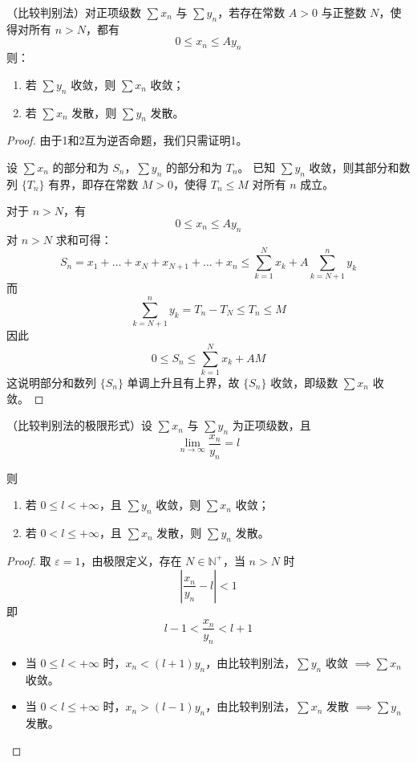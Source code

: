 \begin{proposition}\label{比较判别法}
	（比较判别法）对正项级数 $\sum x_n$ 与 $\sum y_n$，若存在常数 $A>0$ 与正整数 $N$，使得对所有 $n > N$，都有
	\[
	0 \le x_n \le A y_n
	\]
	则：
	\begin{enumerate}
		\item 若 $\sum y_n$ 收敛，则 $\sum x_n$ 收敛；
		\item 若 $\sum x_n$ 发散，则 $\sum y_n$ 发散。
	\end{enumerate}

	
\end{proposition}
\begin{proof}
	由于1和2互为逆否命题，我们只需证明1。
	
	设 $\sum x_n$ 的部分和为 $S_n$，$\sum y_n$ 的部分和为 $T_n$。
	已知 $\sum y_n$ 收敛，则其部分和数列 $\{T_n\}$ 有界，即存在常数 $M>0$，使得 $T_n \le M$ 对所有 $n$ 成立。
	
	对于 $n > N$，有
	\[
	0 \le x_n \le A y_n
	\]
	对 $n > N$ 求和可得：
	\[
	S_n = x_1 + \dots + x_N + x_{N+1} + \dots + x_n
	\le \sum_{k=1}^{N} x_k + A \sum_{k=N+1}^{n} y_k
	\]
	而
	\[
	\sum_{k=N+1}^{n} y_k = T_n - T_N \le T_n \le M
	\]
	因此
	\[
	0 \le S_n \le \sum_{k=1}^{N} x_k + A M
	\]
	这说明部分和数列 $\{S_n\}$ 单调上升且有上界，故 $\{S_n\}$ 收敛，即级数 $\sum x_n$ 收敛。
\end{proof}
\begin{corollary}
	（比较判别法的极限形式）设 $\sum x_n$ 与 $\sum y_n$ 为正项级数，且
	\[
	\lim_{n\to\infty} \frac{x_n}{y_n} = l
	\]
	
	则
	\begin{enumerate}
		\item 若 $0 \le l < +\infty$，且 $\sum y_n$ 收敛，则 $\sum x_n$ 收敛；
		\item 若 $0 < l \le +\infty$，且 $\sum x_n$ 发散，则 $\sum y_n$ 发散。
	\end{enumerate}
	
\end{corollary}
\begin{proof}
	取 $\varepsilon = 1$，由极限定义，存在 $N \in \mathbb{N}^+$，当 $n > N$ 时
	\[
	\left| \frac{x_n}{y_n} - l \right| < 1
	\]
	即
	\[
	l-1 < \frac{x_n}{y_n} < l+1
	\]
	
	\begin{itemize}
		\item 当 $0 \le l < +\infty$ 时，$x_n < (l+1)y_n$，由比较判别法，$\sum y_n$ 收敛 $\implies \sum x_n$ 收敛。
		\item 当 $0 < l \le +\infty$ 时，$x_n > (l-1)y_n$，由比较判别法，$\sum x_n$ 发散 $\implies \sum y_n$ 发散。
	\end{itemize}
	
	
	
	
\end{proof}
